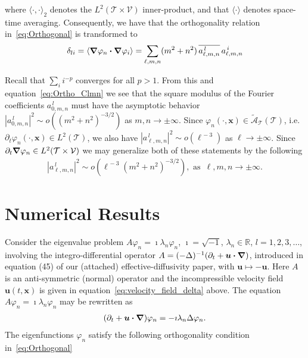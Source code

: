 \documentclass[leqno,onefignum,onetabnum]{siamltex1213}
\newcommand{\Tc}{\mathcal{T}}
\newcommand{\Vc}{\mathcal{V}}
\newcommand{\As}{\mathscr{A}}
\newcommand\bnabla{\mbox{\boldmath${\nabla}$}}
\providecommand\bcdot{\boldsymbol{\cdot}}
\newcommand{\vecx}{\boldsymbol{x}}
\newcommand{\vecu}{\boldsymbol{u}}
\begin{document}
where $\langle\cdot,\cdot\rangle_2$ denotes the $L^2(\Tc\times\Vc)$ inner-product, and that
$\langle\cdot\rangle$ denotes space-time averaging. Consequently, we have that the
orthogonality relation in~\eqref{eq:Orthogonal} is transformed to   
%
\begin{align}\label{eq:Ortho_Clmn}
  \delta_{li}=\langle\bnabla \varphi_n\bcdot\bnabla \varphi_i\rangle
      = \sum_{\ell,m,n}(m^2+n^2)\,\overline{a^{\,l}_{\ell,m,n}}\,a^{\,i}_{\ell,m,n}
\end{align}
%


Recall that $\sum_ii^{-p}$ converges for all $p>1$. From this and
equation~\eqref{eq:Ortho_Clmn} we see that the square modulus of the  
Fourier coefficients $a^{\,l}_{0,m,n}$ must have the asymptotic behavior 
$|a^{\,l}_{0,m,n}|^2\sim o((m^2+n^2)^{-3/2})$ as $m,n\to\pm\infty$. Since
$\varphi_n(\cdot,\vecx)\in\tilde{\As}_{\Tc}(\Tc)$, i.e. $\partial_t\varphi_n(\cdot,\vecx)\in L^2(\Tc)$, we also
have $|a^{\,l}_{\ell,m,n}|^2\sim o(\ell^{\,-3})$ as $\ell\to\pm\infty$. Since
$\partial_t\bnabla \varphi_n\in L^2(\Tc\times\Vc)$ we may generalize 
both of these statements by the following
%
\begin{align}\label{eq:Clmn_assymptotics}
  |a^{\,l}_{\ell,m,n}|^2\sim o(\ell^{\,-3}(m^2+n^2)^{-3/2}), \text{ as } \,\ell,m,n\to\pm\infty.
\end{align}
%







\section{Numerical Results}
%
Consider the eigenvalue problem $A\varphi_n=\imath\lambda_n\varphi_n$, $\imath=\sqrt{-1}$,
$\lambda_n\in\mathbb{R}$, $l=1,2,3,\ldots$, involving the integro-differential operator
$A=(-\Delta)^{-1}(\partial_t+\vecu \bcdot\bnabla )$,  
introduced in equation (45) of our (attached) effective-diffusivity
paper, with $\vecu \mapsto-\vecu $. Here $A$ is an anti-symmetric (normal)
operator and the incompressible velocity field
$\vecu (t,\vecx)$
is given in equation~\eqref{eq:velocity_field_delta} above. The equation $A\varphi_n=\imath\lambda_n\varphi_n$ may be
rewritten as     
%
\begin{align}\label{eq:Eig_prob}
  (\partial_t+\vecu \bcdot\bnabla )\varphi_n=-\imath\lambda_n\Delta\varphi_n.
\end{align}
%
The eigenfunctions $\varphi_n$ satisfy the following orthogonality condition
in~\eqref{eq:Orthogonal}
%
\end{document}
